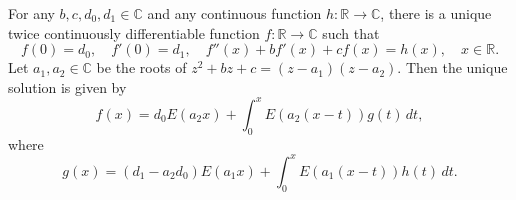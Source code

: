 For any $b, c, d_0, d_1 \in \mathbb{C}$ and any continuous function $h: \mathbb{R} \to \mathbb{C}$, there is a unique twice continuously differentiable function $f: \mathbb{R} \to \mathbb{C}$ such that
$$f(0) = d_0, \quad f'(0) = d_1, \quad f''(x) + bf'(x) + cf(x) = h(x), \quad x \in \mathbb{R}.$$
Let $a_1, a_2 \in \mathbb{C}$ be the roots of $z^2 + bz + c = (z - a_1)(z - a_2)$. Then the unique solution is given by
$$f(x) = d_0E(a_2x) + \int_0^x E(a_2(x-t))g(t)\,dt,$$
where
$$g(x) = (d_1 - a_2d_0)E(a_1x) + \int_0^x E(a_1(x-t))h(t)\,dt.$$
